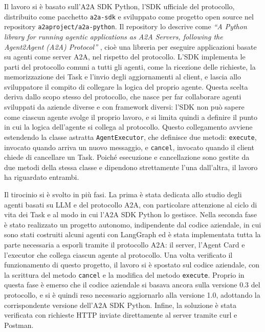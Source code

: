 Il lavoro si è basato sull'A2A SDK Python, l'SDK ufficiale del protocollo, distribuito come pacchetto \texttt{a2a-sdk} e sviluppato come progetto open source nel repository \texttt{a2aproject/a2a-python}. Il repository lo descrive come \emph{``A Python library for running agentic applications as A2A Servers, following the Agent2Agent (A2A) Protocol''} \cite{a2apythonsdk}, cioè una libreria per eseguire applicazioni basate su agenti come server A2A, nel rispetto del protocollo. L'SDK implementa le parti del protocollo comuni a tutti gli agenti, come la ricezione delle richieste, la memorizzazione dei Task e l'invio degli aggiornamenti al client, e lascia allo sviluppatore il compito di collegare la logica del proprio agente. Questa scelta deriva dallo scopo stesso del protocollo, che nasce per far collaborare agenti sviluppati da aziende diverse e con framework diversi: l'SDK non può sapere come ciascun agente svolge il proprio lavoro, e si limita quindi a definire il punto in cui la logica dell'agente si collega al protocollo. Questo collegamento avviene estendendo la classe astratta \texttt{AgentExecutor}, che definisce due metodi: \texttt{execute}, invocato quando arriva un nuovo messaggio, e \texttt{cancel}, invocato quando il client chiede di cancellare un Task. Poiché esecuzione e cancellazione sono gestite da due metodi della stessa classe e dipendono strettamente l'una dall'altra, il lavoro ha riguardato entrambi.

Il tirocinio si è svolto in più fasi. La prima è stata dedicata allo studio degli agenti basati su LLM e del protocollo A2A, con particolare attenzione al ciclo di vita dei Task e al modo in cui l'A2A SDK Python lo gestisce. Nella seconda fase è stato realizzato un progetto autonomo, indipendente dal codice aziendale, in cui sono stati costruiti alcuni agenti con LangGraph ed è stata implementata tutta la parte necessaria a esporli tramite il protocollo A2A: il server, l'Agent Card e l'executor che collega ciascun agente al protocollo. Una volta verificato il funzionamento di questo progetto, il lavoro si è spostato sul codice aziendale, con la scrittura del metodo \texttt{cancel} e la modifica del metodo \texttt{execute}. Proprio in questa fase è emerso che il codice aziendale si basava ancora sulla versione 0.3 del protocollo, e si è quindi reso necessario aggiornarlo alla versione 1.0, adottando la corrispondente versione dell'A2A SDK Python. Infine, la soluzione è stata verificata con richieste HTTP inviate direttamente al server tramite curl e Postman.

